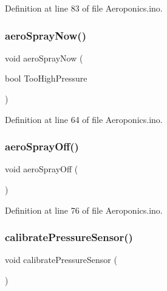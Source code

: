 Definition at line 83 of file Aeroponics.\+ino.

\mbox{\label{_aeroponics_8ino_a4591cb3c1e6630008edce8f01e4bc114}} 
\subsubsection{\texorpdfstring{aeroSprayNow()}{aeroSprayNow()}}
{\footnotesize\ttfamily void aero\+Spray\+Now (\begin{DoxyParamCaption}\item[{bool}]{Too\+High\+Pressure }\end{DoxyParamCaption})}



Definition at line 64 of file Aeroponics.\+ino.

\mbox{\label{_aeroponics_8ino_a4eccc064eadb2c65ea1bb74603bcb27a}} 
\subsubsection{\texorpdfstring{aeroSprayOff()}{aeroSprayOff()}}
{\footnotesize\ttfamily void aero\+Spray\+Off (\begin{DoxyParamCaption}{ }\end{DoxyParamCaption})}



Definition at line 76 of file Aeroponics.\+ino.

\mbox{\label{_aeroponics_8ino_a258343773951853857b9e526171efd0b}} 
\subsubsection{\texorpdfstring{calibratePressureSensor()}{calibratePressureSensor()}}
{\footnotesize\ttfamily void calibrate\+Pressure\+Sensor (\begin{DoxyParamCaption}{ }\end{DoxyParamCaption})}



